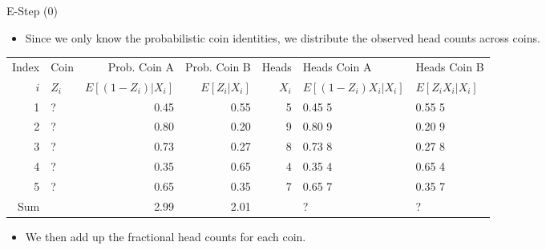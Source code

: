 \documentclass[dvipdfmx,bigger,aspectratio=169]{beamer}
\begin{document}
\begin{frame}[fragile,allowframebreaks,label=,t]{E-Step (0)}
\newpage
\begin{itemize}
\item Since we only know the probabilistic coin identities, we distribute the observed head counts across coins.
\end{itemize}
\footnotesize
\begin{center}
\begin{tabular}{r|l|rr|r|ll|}
Index & Coin & Prob. Coin A & Prob. Coin B & Heads & Heads Coin A & Heads Coin B\\
\(i\) & \(Z_{i}\) & \(E[(1-Z_{i})\vert X_{i}]\) & \(E[Z_{i}\vert X_{i}]\) & \(X_{i}\) & \(E[(1-Z_{i}) X_{i} \vert X_{i}]\) & \(E[Z_{i} X_{i} \vert X_{i}]\)\\
\hline
1 & ? & 0.45 & 0.55 & 5 & 0.45 \texttimes{} 5 & 0.55 \texttimes{} 5\\
2 & ? & 0.80 & 0.20 & 9 & 0.80 \texttimes{} 9 & 0.20 \texttimes{} 9\\
3 & ? & 0.73 & 0.27 & 8 & 0.73 \texttimes{} 8 & 0.27 \texttimes{} 8\\
4 & ? & 0.35 & 0.65 & 4 & 0.35 \texttimes{} 4 & 0.65 \texttimes{} 4\\
5 & ? & 0.65 & 0.35 & 7 & 0.65 \texttimes{} 7 & 0.35 \texttimes{} 7\\
\hline
Sum &  & 2.99 & 2.01 &  & ? & ?\\
\end{tabular}
\end{center}
\normalsize
\begin{itemize}
\item We then add up the fractional head counts for each coin.
\end{itemize}


\end{frame}
\end{document}

